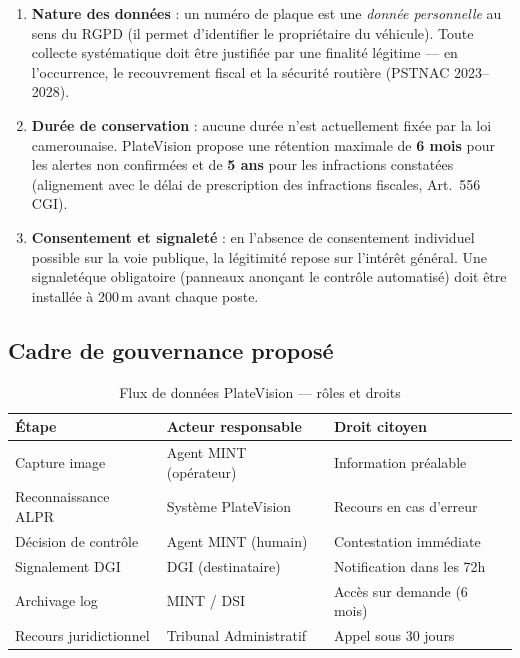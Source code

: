 \begin{enumerate}
  \item \textbf{Nature des donn\'{e}es} : un num\'{e}ro de plaque est une
        \textit{donn\'{e}e personnelle} au sens du RGPD (il permet d'identifier
        le propri\'{e}taire du v\'{e}hicule). Toute collecte syst\'{e}matique
        doit \^{e}tre justifi\'{e}e par une finalit\'{e} l\'{e}gitime --- en
        l'occurrence, le recouvrement fiscal et la s\'{e}curit\'{e} routi\`{e}re
        (PSTNAC 2023--2028).
  \item \textbf{Dur\'{e}e de conservation} : aucune dur\'{e}e n'est actuellement
        fix\'{e}e par la loi camerounaise. PlateVision propose une r\'{e}tention
        maximale de \textbf{6 mois} pour les alertes non confirm\'{e}es et de
        \textbf{5 ans} pour les infractions constat\'{e}es (alignement avec le
        d\'{e}lai de prescription des infractions fiscales, Art.~556 CGI).
  \item \textbf{Consentement et signalet\'{e}} : en l'absence de consentement
        individuel possible sur la voie publique, la l\'{e}gitimit\'{e} repose
        sur l'int\'{e}r\^{e}t g\'{e}n\'{e}ral. Une signalet\'{e}que obligatoire
        (panneaux anon\c{c}ant le contr\^{o}le automatis\'{e}) doit \^{e}tre
        install\'{e}e \`{a} 200\,m avant chaque poste.
\end{enumerate}

\subsection{Cadre de gouvernance propos\'{e}}
\label{sec:d:gouvernance_cameras}

\begin{table}[H]
\centering
\caption{Flux de donn\'{e}es PlateVision --- r\^{o}les et droits}
\label{tab:d:flux}
\begin{tabular}{lll}
\toprule
\textbf{\'{E}tape} & \textbf{Acteur responsable} & \textbf{Droit citoyen} \\
\midrule
Capture image              & Agent MINT (op\'{e}rateur)  & Information pr\'{e}alable \\
Reconnaissance ALPR        & Syst\`{e}me PlateVision      & Recours en cas d'erreur \\
D\'{e}cision de contr\^{o}le & Agent MINT (humain)       & Contestation imm\'{e}diate \\
Signalement DGI            & DGI (destinataire)          & Notification dans les 72h \\
Archivage log              & MINT / DSI                  & Acc\`{e}s sur demande (6 mois) \\
Recours juridictionnel     & Tribunal Administratif      & Appel sous 30 jours \\
\bottomrule
\end{tabular}
\end{table}

